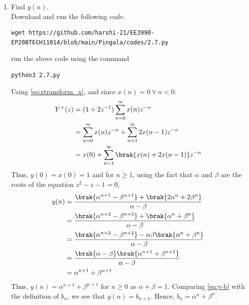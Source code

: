 \documentclass[journal,12pt,twocolumn]{IEEEtran}
\renewcommand\thesection{\arabic{section}}
\begin{document}
\begin{enumerate}[label=\thesection.\arabic*,ref=\thesection.\theenumi]
\item Find $y(n)$.\label{pr:1-3}\\
\solution 
Download and run the following code.
\begin{lstlisting}
wget https://github.com/harshi-21/EE3990-EP20BTECH11014/blob/main/Pingala/codes/2.7.py
\end{lstlisting}
run the above code using the command
\begin{lstlisting}
python3 2.7.py
\end{lstlisting}
Using \eqref{eq:ztransform_x},
 and since $x(n) = 0\ \forall\ n < 0$.
\begin{align}
    Y^+(z) &= (1 + 2z^{-1})\sum_{n = 0}^{\infty}x(n)z^{-n} \\
           &= \sum_{n = 0}^{\infty}x(n)z^{-n} + \sum_{n = 1}^{\infty}2x(n - 1)z^{-n} \\
           &= x(0) + \sum_{n = 1}^{\infty}\brak{x(n) + 2x(n - 1)}z^{-n}
\end{align}
Thus, $y(0) = x(0) = 1$ and for $n \ge 1$, using the fact that $\alpha$ and 
$\beta$ are the roots of the equation $z^2 - z - 1 = 0$,
\begin{align}
    y(n) &= \frac{\brak{\alpha^{n + 1} - \beta^{n + 1}} + \brak{2\alpha^n + 2\beta^n}}{\alpha - \beta} \\
         &= \frac{\brak{\alpha^{n + 2} - \beta^{n + 2}} + \brak{\alpha^{n} + \beta^{n}}}{\alpha - \beta} \label{eq:y-b} \\
         &= \frac{\brak{\alpha^{n + 2} - \beta^{n + 2}} - \alpha\beta\brak{\alpha^{n} + \beta^{n}}}{\alpha - \beta} \\
         &= \frac{\brak{\alpha - \beta}\brak{\alpha^{n + 1} + \beta^{n + 1}}}{\alpha - \beta} \\
         &= \alpha^{n + 1} + \beta^{n + 1}
\end{align}
Thus, $y(n) = \alpha^{n + 1} + \beta^{n + 1}$ for $n \geq 0$ as $\alpha + \beta = 1$.
Comparing \eqref{eq:y-b} with the definition of $b_n$, we see that $y(n) = b_{n + 1}$.
Hence, $b_n = \alpha^n + \beta^n$.
\end{enumerate}
\end{document}
